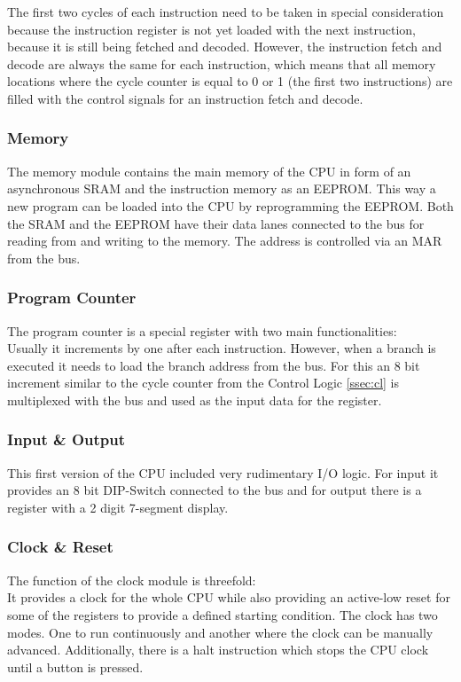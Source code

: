The first two cycles of each instruction need to be taken in special consideration because the instruction register is not yet loaded with the next instruction, because it is still being fetched and decoded.
However, the instruction fetch and decode are always the same for each instruction, which means that all memory locations where the cycle counter is equal to 0 or 1 (the first two instructions) are filled with the control signals for an instruction fetch and decode.
\subsubsection{Memory}
The memory module contains the main memory of the \gls{CPU} in form of an asynchronous \gls{SRAM} and the instruction memory as an \gls{EEPROM}.
This way a new program can be loaded into the \gls{CPU} by reprogramming the \gls{EEPROM}.
Both the \gls{SRAM} and the \gls{EEPROM} have their data lanes connected to the bus for reading from and writing to the memory.
The address is controlled via an \gls{MAR} from the bus.
\subsubsection{Program Counter}
The program counter is a special register with two main functionalities:\\
Usually it increments by one after each instruction.
However, when a branch is executed it needs to load the branch address from the bus.
For this an 8 bit increment similar to the cycle counter from the Control Logic \cref{ssec:cl} is multiplexed with the bus and used as the input data for the register.
\subsubsection{Input \& Output}
This first version of the \gls{CPU} included very rudimentary I/O logic.
For input it provides an 8 bit DIP-Switch connected to the bus and for output there is a register with a 2 digit 7-segment display.
\subsubsection{Clock \& Reset}
The function of the clock module is threefold:\\
It provides a clock for the whole \gls{CPU} while also providing an active-low reset for some of the registers to provide a defined starting condition.
The clock has two modes. One to run continuously and another where the clock can be manually advanced.
Additionally, there is a halt instruction which stops the \gls{CPU} clock until a button is pressed.
